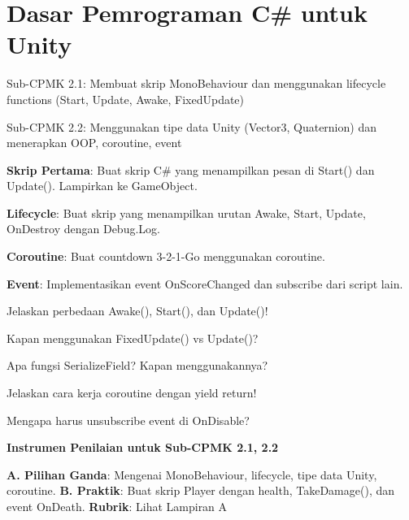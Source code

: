 \documentclass[../main]{subfiles}
\begin{document}
\chapter{Dasar Pemrograman C\# untuk Unity}

\begin{subcpmk}
  \item Sub-CPMK 2.1: Membuat skrip MonoBehaviour dan menggunakan lifecycle functions (Start, Update, Awake, FixedUpdate)
  \item Sub-CPMK 2.2: Menggunakan tipe data Unity (Vector3, Quaternion) dan menerapkan OOP, coroutine, event
\end{subcpmk}






\begin{aktivitas}
  \item \textbf{Skrip Pertama}: Buat skrip C\# yang menampilkan pesan di Start() dan Update(). Lampirkan ke GameObject.
  \item \textbf{Lifecycle}: Buat skrip yang menampilkan urutan Awake, Start, Update, OnDestroy dengan Debug.Log.
  \item \textbf{Coroutine}: Buat countdown 3-2-1-Go menggunakan coroutine.
  \item \textbf{Event}: Implementasikan event OnScoreChanged dan subscribe dari script lain.
\end{aktivitas}

\begin{latihan}
  \item Jelaskan perbedaan Awake(), Start(), dan Update()!
  \item Kapan menggunakan FixedUpdate() vs Update()?
  \item Apa fungsi SerializeField? Kapan menggunakannya?
  \item Jelaskan cara kerja coroutine dengan yield return!
  \item Mengapa harus unsubscribe event di OnDisable?
\end{latihan}

\begin{asesmen}
\textbf{Instrumen Penilaian untuk Sub-CPMK 2.1, 2.2}

\textbf{A. Pilihan Ganda}: Mengenai MonoBehaviour, lifecycle, tipe data Unity, coroutine.
\textbf{B. Praktik}: Buat skrip Player dengan health, TakeDamage(), dan event OnDeath.
\textbf{Rubrik}: Lihat Lampiran A
\end{asesmen}
\end{document}
